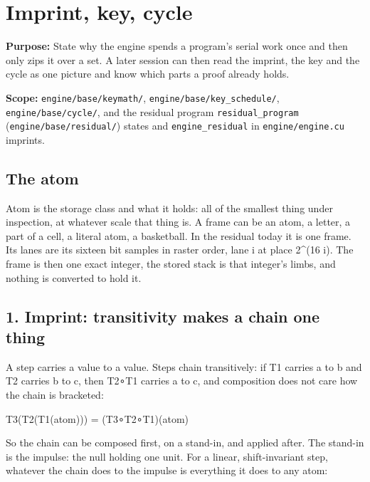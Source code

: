 \chapter{\texorpdfstring{Imprint, key, cycle}{Imprint, key, cycle}}
\label{chap:imprint-key-cycle}

\textbf{Purpose:} State why the engine spends a program's serial work once and then only zips it over a set. A later session can then read the imprint, the key and the cycle as one picture and know which parts a proof already holds.

\textbf{Scope:} \texttt{engine/\allowbreak{}base/\allowbreak{}keymath/\allowbreak{}}, \texttt{engine/\allowbreak{}base/\allowbreak{}key\_\allowbreak{}schedule/\allowbreak{}}, \texttt{engine/\allowbreak{}base/\allowbreak{}cycle/\allowbreak{}}, and the residual program \texttt{residual\_\allowbreak{}program} (\texttt{engine/\allowbreak{}base/\allowbreak{}residual/\allowbreak{}}) states and \texttt{engine\_\allowbreak{}residual} in \texttt{engine/\allowbreak{}engine.\allowbreak{}cu} imprints.

\section{\texorpdfstring{The atom}{The atom}}

Atom is the storage class and what it holds: all of the smallest thing under inspection, at whatever scale that thing is. A frame can be an atom, a letter, a part of a cell, a literal atom, a basketball. In the residual today it is one frame. Its lanes are its sixteen bit samples in raster order, lane i at place 2\textasciicircum{}(16 i). The frame is then one exact integer, the stored stack is that integer's limbs, and nothing is converted to hold it.

\section{\texorpdfstring{1. Imprint: transitivity makes a chain one thing}{1. Imprint: transitivity makes a chain one thing}}

A step carries a value to a value. Steps chain transitively: if T1 carries a to b and T2 carries b to c, then T2∘T1 carries a to c, and composition does not care how the chain is bracketed:

T3(T2(T1(atom))) = (T3∘T2∘T1)(atom)

So the chain can be composed first, on a stand-in, and applied after. The stand-in is the impulse: the null holding one unit. For a linear, shift-invariant step, whatever the chain does to the impulse is everything it does to any atom:

